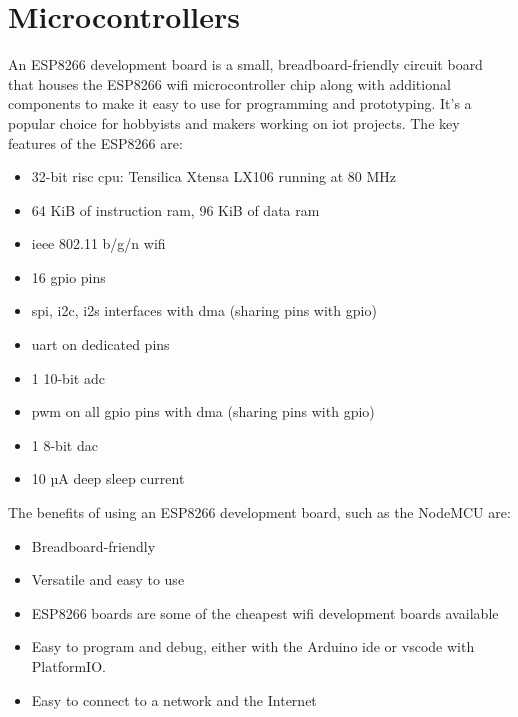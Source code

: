 \section{Microcontrollers}
\label{sec:microcontrollers}
An ESP8266 development board is a small, breadboard-friendly circuit board that houses the ESP8266 \gls{wifi} microcontroller chip along with additional components to make 
it easy to use for programming and prototyping. It's a popular choice for hobbyists and makers working on \gls{iot} projects.
The key features of the ESP8266 are:
\begin{itemize}
\item 32-bit \gls{risc} \gls{cpu}: Tensilica Xtensa LX106 running at 80 MHz
\item 64 KiB of instruction \gls{ram}, 96 KiB of data \gls{ram}
\item \gls{ieee} 802.11 b/g/n \gls{wifi}
\item 16 \gls{gpio} pins
\item \gls{spi}, \gls{i2c}, \gls{i2s} interfaces with \gls{dma} (sharing pins with \gls{gpio})
\item \gls{uart} on dedicated pins
\item 1 10-bit \gls{adc}
\item \gls{pwm} on all \gls{gpio} pins with \gls{dma} (sharing pins with \gls{gpio})
\item 1 8-bit \gls{dac}
\item 10 µA deep sleep current
\end{itemize}
The benefits of using an ESP8266 development board, such as the NodeMCU are:
\begin{itemize}
\item Breadboard-friendly
\item Versatile and easy to use
\item ESP8266 boards are some of the cheapest \gls{wifi} development boards available
\item Easy to program and debug, either with the Arduino \gls{ide} or \gls{vscode} with PlatformIO.
\item Easy to connect to a network and the Internet
\end{itemize}

